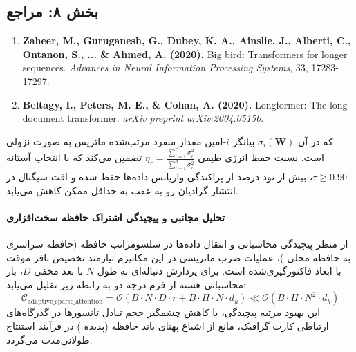 
\subsection*{بخش ۸: مراجع }
\begin{latin}
\begin{enumerate}
    \item \textbf{Zaheer, M., Guruganesh, G., Dubey, K. A., Ainslie, J., Alberti, C., Ontanon, S., ... \& Ahmed, A. (2020).} Big bird: Transformers for longer sequences. \textit{Advances in Neural Information Processing Systems}, 33, 17283-17297.
    \item \textbf{Beltagy, I., Peters, M. E., \& Cohan, A. (2020).} Longformer: The long-document transformer. \textit{arXiv preprint arXiv:2004.05150}.
\end{enumerate}
\end{latin}

که در آن $\sigma_i(\mathbf{W})$ بیانگر $i$-امین مقدار منفرد مرتب‌شده ماتریس به صورت نزولی است. نسبت حفظ انرژی طیفی $\eta_r = \frac{\sum_{i=1}^r \sigma_i^2}{\sum_{i=1}^{d} \sigma_i^2}$ تضمین می‌کند که با انتخاب آستانه $\tau \ge 0.90$، بیش از نود درصد از پراکندگی واریانس داده‌ها حفظ شده و افت سیگنال در انتشار گرادیان رو به عقب به حداقل ممکن کاهش می‌یابد.

\paragraph{تحلیل مجانبی و پیچیدگی اشتراک حافظه سخت‌افزاری}
از منظر پیچیدگی محاسباتی و انتقال داده‌ها در سلسومراتب حافظه (حافظه سراسری  به حافظه محلی )، عملیات ضرب ماتریسی در این مکانیزم نیازمند تخصیص بافر موقت با ابعاد فاکتورگیری‌شده است. برای پردازش دنباله‌ای به طول $N$ با بعد مخفی $D$، بار محاسباتی هسته از فرم درجه دو به رابطه زیر تقلیل می‌یابد:
\begin{equation}
\label{eq:complexity_adaptive_sparse_attention}
\mathcal{C}_{\text{adaptive\_sparse\_attention}} = \mathcal{O}\left( B \cdot N \cdot D \cdot r + B \cdot H \cdot N \cdot d_k \right) \ll \mathcal{O}\left( B \cdot H \cdot N^2 \cdot d_k \right)
\end{equation}
این بهبود مرتبه پیچیدگی، با کاهش چشمگیر حجم تبادل تانسورها در گذرگاه‌های ارتباطی کارت گرافیک، مانع از اشباع پهنای باند حافظه (پدیده ) در فرآیند استنتاج طولانی‌مدت می‌گردد.